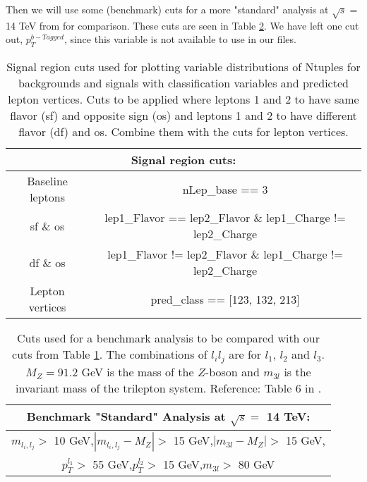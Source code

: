 \documentclass[a4paper, american, 12pt]{report}
\begin{document}
	Then we will use some (benchmark) cuts for a more "standard" analysis at $\sqrt{s} =$ 14 TeV from \citet{inverseseesaw} for comparison. These cuts are seen in Table \ref{tab:Cuts_Benchmark}. We have left one cut out, $p_T^{b-Tagged}$, since this variable is not available to use in our files.
	\begin{table}[h!]
		\hspace{-0.5cm}
		\begin{tabular}{|c|c|}
			\hline
			\multicolumn{2}{|c|}{\textbf{Signal region cuts:}}\\
			\hline \rule{0pt}{13pt}
			Baseline leptons & nLep\_base == 3 \\
			\acrshort{sf} \& \acrshort{os} & lep1\_Flavor == lep2\_Flavor \& lep1\_Charge != lep2\_Charge\\
			\acrshort{df} \& \acrshort{os} & lep1\_Flavor != lep2\_Flavor \& lep1\_Charge != lep2\_Charge\\
			Lepton vertices & pred\_class == [123, 132, 213]\\
			\hline
		\end{tabular}
		\caption[Signal region cuts for Ntuples.]{Signal region cuts used for plotting variable distributions of Ntuples for backgrounds and signals with classification variables and predicted lepton vertices. Cuts to be applied where leptons 1 and 2 to have same flavor (\acrshort{sf}) and opposite sign (\acrshort{os}) and leptons 1 and 2 to have different flavor (\acrshort{df}) and \acrshort{os}. Combine them with the cuts for lepton vertices.}
		\label{tab:Cuts_class}
	\end{table}
	\begin{table}[ht!]
		\centering
		\begin{tabular}{|c|}
			\hline \rule{0pt}{13pt}
			\textbf{Benchmark "Standard" Analysis at $\sqrt{s}=$ 14 TeV:}\\
			\hline \rule{0pt}{13pt}
			$m_{l_i,l_j}>$ 10 GeV,\quad $|m_{l_i,l_j}-M_Z|>$ 15 GeV,\quad $|m_{3l}-M_Z|>$ 15 GeV,\\
			$p_T^{l_1}>$ 55 GeV,\quad $p_T^{l_2}>$ 15 GeV,\quad $m_{3l}>$ 80 GeV\\
			\hline
		\end{tabular}
		\caption[Benchmark analysis cuts.]{Cuts used for a benchmark analysis to be compared with our cuts from Table \ref{tab:Cuts_class}. The combinations of $l_il_j$ are for $l_1$, $l_2$ and $l_3$. $M_Z=91.2$ GeV is the mass of the $Z$-boson and $m_{3l}$ is the invariant mass of the trilepton system. Reference: Table 6 in \citet{inverseseesaw}.}
		\label{tab:Cuts_Benchmark}
	\end{table}
			
\end{document}
